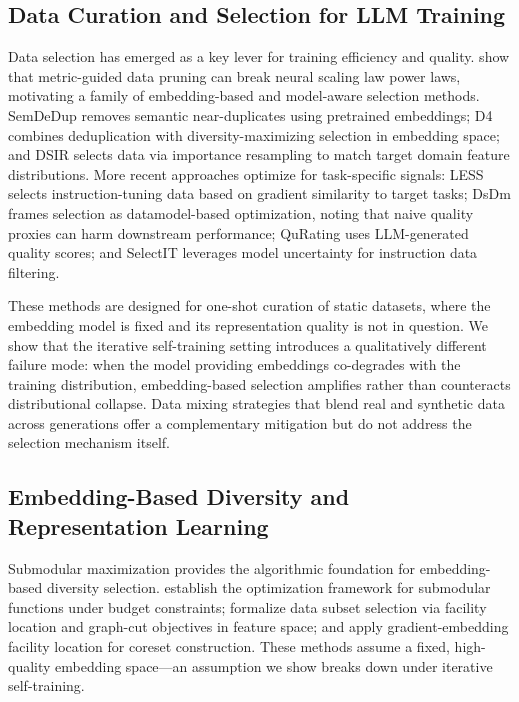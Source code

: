 \subsection{Data Curation and Selection for LLM Training}

Data selection has emerged as a key lever for training efficiency and quality. \citet{sorscher2022beyond} show that metric-guided data pruning can break neural scaling law power laws, motivating a family of embedding-based and model-aware selection methods. SemDeDup \citep{abbas2023semdedup} removes semantic near-duplicates using pretrained embeddings; D4 \citep{tirumala2023d4} combines deduplication with diversity-maximizing selection in embedding space; and DSIR \citep{xie2023data} selects data via importance resampling to match target domain feature distributions. More recent approaches optimize for task-specific signals: LESS \citep{xia2024less} selects instruction-tuning data based on gradient similarity to target tasks; DsDm \citep{engstrom2024dsdm} frames selection as datamodel-based optimization, noting that naive quality proxies can harm downstream performance; QuRating \citep{wettig2024qurating} uses LLM-generated quality scores; and SelectIT \citep{liu2024selectit} leverages model uncertainty for instruction data filtering.

These methods are designed for one-shot curation of static datasets, where the embedding model is fixed and its representation quality is not in question. We show that the iterative self-training setting introduces a qualitatively different failure mode: when the model providing embeddings co-degrades with the training distribution, embedding-based selection amplifies rather than counteracts distributional collapse. Data mixing strategies that blend real and synthetic data across generations \citep{gerstgrasser2024model} offer a complementary mitigation but do not address the selection mechanism itself.

\subsection{Embedding-Based Diversity and Representation Learning}

Submodular maximization provides the algorithmic foundation for embedding-based diversity selection. \citet{iyer2013submodular} establish the optimization framework for submodular functions under budget constraints; \citet{wei2015submodularity} formalize data subset selection via facility location and graph-cut objectives in feature space; and \citet{mirzasoleiman2020coresets} apply gradient-embedding facility location for coreset construction. These methods assume a fixed, high-quality embedding space---an assumption we show breaks down under iterative self-training.

